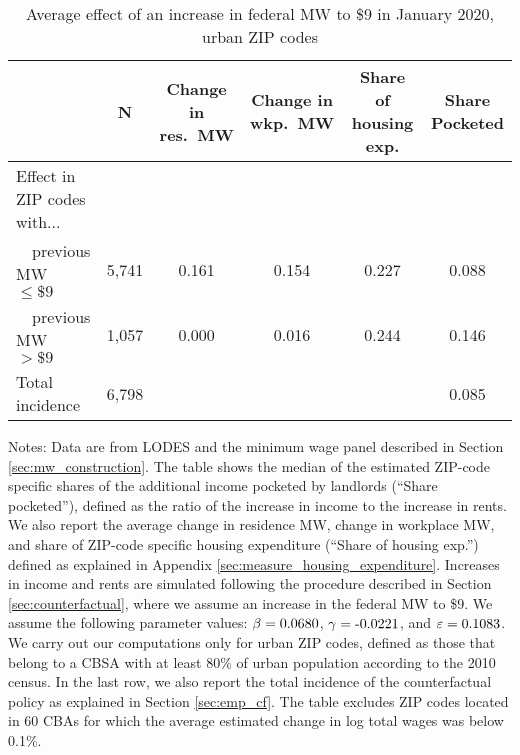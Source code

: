 \begin{table}[hbt!]
    \centering
    \caption{Average effect of an increase in federal MW to \$9 in January 2020, urban ZIP codes}
    \label{tab:counterfactuals_fed_9usd}

    \begin{tabular}{@{}lccccc@{}}
        \toprule
                         & N & \shortstack{Change in\\res.\ MW}
                             & \shortstack{Change in\\wkp.\ MW}
                             & \shortstack{Share of\\housing exp.}  
                             & \shortstack{Share\\Pocketed}                      \\ \midrule
        Effect in ZIP codes with...          &      &       &       &     &      \\
        $\quad$previous MW $\leq\$9\quad$    & 5,741 &  0.161 & 0.154  & 0.227 &  0.088   \\
        $\quad$previous MW $>\$9\quad$       & 1,057 &  0.000 & 0.016  & 0.244 & 0.146    \\ 
        Total incidence                      & 6,798 &      &      &     & 0.085    \\ \bottomrule
    \end{tabular}
    
    \begin{minipage}{.95\textwidth} \footnotesize
        \vspace{2mm}
        Notes: 
        Data are from LODES and the minimum wage panel described in Section 
        \ref{sec:mw_construction}.
        The table shows the median of the estimated ZIP-code specific shares of the 
        additional income pocketed by landlords (``Share pocketed''), 
        defined as the ratio of the increase in income to the increase in rents. 
        We also report the average change in residence MW, change in workplace MW,
        and share of ZIP-code specific housing expenditure 
        (``Share of housing exp.'') defined as explained in Appendix \ref{sec:measure_housing_expenditure}.
        Increases in income and rents are simulated following the procedure 
        described in Section \ref{sec:counterfactual},
        where we assume an increase in the federal MW to \$9.
        We assume the following parameter values: 
        $\beta = \textnormal{0.0680}$, $\gamma = \textnormal{-0.0221}$, 
        and $\varepsilon = \textnormal{0.1083}$.
        We carry out our computations only for urban ZIP codes, defined as 
        those that belong to a CBSA with at least 80\% of urban population
        according to the 2010 census.
        In the last row, we also report the total incidence of the counterfactual policy
        as explained in Section \ref{sec:emp_cf}.
        The table excludes ZIP codes located in 60 CBAs for which the average
        estimated change in log total wages was below 0.1\%.
    \end{minipage}
\end{table}


